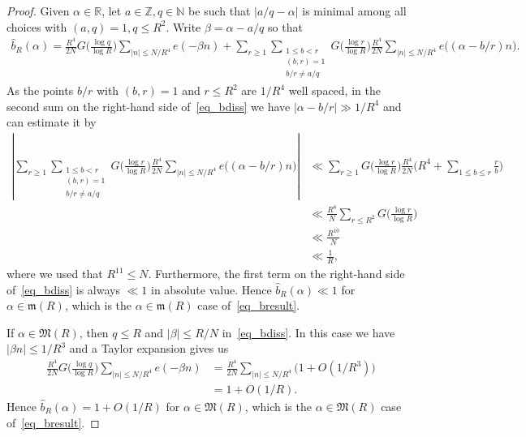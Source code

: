 \documentclass[12pt]{amsart}
\theoremstyle{definition}
\theoremstyle{remark}
\numberwithin{equation}{section}
\newcommand{\1}{\mathbf{1}}
\newcommand{\Z}{{\mathbb Z}}
\newcommand{\N}{{\mathbb N}}
\begin{document}
\begin{proof}
    Given $\alpha\in \mathbb{R}$, let $a\in \Z, q\in \N$ be such that $|a/q-\alpha|$ is minimal among all choices with $(a,q)=1, q\leq R^2$. Write $\beta=\alpha-a/q$ so that
	\begin{align}\label{eq_bdiss}
	   \widehat{b}_R(\alpha)=\frac{R^4}{2N} G\bigl(\frac{\log q}{\log R}\bigr)\sum_{|n|\leq N/R^4}e(-\beta n)+\sum_{r\geq 1}\sum_{\substack{1\leq b<r\\ (b,r)=1 \\ b/r\neq a/q}} G\bigl(\frac{\log r}{\log R}\bigr) \frac{R^4}{2N}\sum_{|n|\leq N/R^4} e\bigl( (\alpha-b/r)n\bigr).
	\end{align}
	As the points $b/r$ with $(b,r)=1$ and $r\leq R^2$ are $1/R^4$ well spaced, in the second sum on the right-hand side of~\eqref{eq_bdiss} we have $|\alpha-b/r|\gg 1/R^4$ and can estimate it by
	\begin{align*}
	   \left|\sum_{r\geq 1}\sum_{\substack{1\leq b<r\\ (b,r)=1 \\ b/r\neq a/q}}  G\bigl(\frac{\log r}{\log R}\bigr) \frac{R^4}{2N}\sum_{|n|\leq N/R^4} e\bigl( (\alpha-b/r)n\bigr)\right|
	   &\ll \sum_{r\geq 1} G\bigl(\frac{\log r}{\log R}\bigr)\frac{R^4}{2N} \bigl(R^4+\sum_{1\leq b\leq r}\frac{r}{b}\bigr)\\
	   &\ll \frac{R^8}{N}\sum_{r\leq R^2} G\bigl(\frac{\log r}{\log R}\bigr)\\
	   &\ll \frac{R^{10}}{N}\\
	   &\ll \frac{1}{R},
	\end{align*}
	where we used that $R^{11}\leq N$. Furthermore, the first term on the right-hand side of~\eqref{eq_bdiss} is always $\ll 1$ in absolute value. Hence $\widehat b_R(\alpha)\ll 1$ for $\alpha\in\mathfrak m(R)$, which is the $\alpha \in \mathfrak{m}(R)$ case of~\eqref{eq_bresult}.
    
    If $\alpha\in \mathfrak{M}(R)$, then $q\leq R$ and $|\beta|\leq R/N$ in~\eqref{eq_bdiss}. In this case we have $|\beta n|\leq 1/R^3$ and a Taylor expansion gives us
	\begin{align*}
		\frac{R^4}{2N} G\bigl(\frac{\log q}{\log R}\bigr)\sum_{|n|\leq N/R^4}e(-\beta n)&=\frac{R^4}{2N}\sum_{|n|\leq N/R^4}\bigl(1+O(1/R^3)\bigr)\\
		&= 1 + O(1/R).
	\end{align*}
	Hence $\widehat b_R(\alpha)=1+O(1/R)$ for $\alpha\in\mathfrak M(R)$, which is the $\alpha \in \mathfrak{M}(R)$ case of~\eqref{eq_bresult}.
\end{proof}
\end{document}
